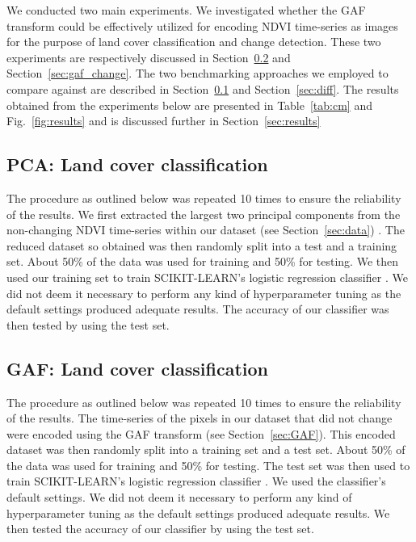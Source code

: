 \documentclass{article}
\begin{document}
We conducted two main experiments. We investigated whether the GAF transform could be effectively utilized for encoding NDVI time-series as images for the purpose of land cover classification and change detection. These two experiments are respectively discussed in Section~\ref{sec:gaf_class} and Section~\ref{sec:gaf_change}. The two benchmarking approaches we employed to compare against are described in Section~\ref{sec:pca} and Section~\ref{sec:diff}. The results obtained from the experiments below are presented in Table~\ref{tab:cm} and Fig.~\ref{fig:results} and is discussed further in Section~\ref{sec:results}        

\subsection{PCA: Land cover classification}
\label{sec:pca}
The procedure as outlined below was repeated 10 times to ensure the reliability of the results.  We first extracted the largest two principal components from the non-changing NDVI time-series within our dataset (see Section~\ref{sec:data}) \cite{almeide2015,grobler2019}. The reduced dataset so obtained was then randomly split into a test and a training set. About 50\% of the data was used for training and 50\% for testing. We then used our training set to train \textsc{SCIKIT-LEARN}'s logistic regression classifier \cite{scikit2011}. We did not deem it necessary to perform any kind of hyperparameter tuning as the default settings produced adequate results. The accuracy of our classifier was then tested by using the test set. 

\subsection{GAF: Land cover classification}
\label{sec:gaf_class}
The procedure as outlined below was repeated 10 times to ensure the reliability of the results. The time-series of the pixels in our dataset that did not change were encoded using the GAF transform (see Section~\ref{sec:GAF}). This encoded dataset was then randomly split into a training set and a test set. About 50\% of the data was used for training and 50\% for testing. The test set was then used to train \textsc{SCIKIT-LEARN}'s logistic regression classifier \cite{scikit2011}. We used the classifier's default settings. We did not deem it necessary to perform any kind of hyperparameter tuning as the default settings produced adequate results. We then tested the accuracy of our classifier by using the test set. 
\end{document}
